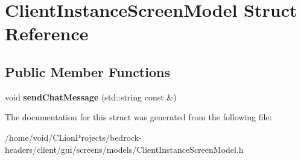 \hypertarget{struct_client_instance_screen_model}{}\section{Client\+Instance\+Screen\+Model Struct Reference}
\label{struct_client_instance_screen_model}
\subsection*{Public Member Functions}
\begin{DoxyCompactItemize}
\item 
\mbox{\label{struct_client_instance_screen_model_a3a33cc4aa7f3a3e2d51b4b42534473e6}} 
void {\bfseries send\+Chat\+Message} (std\+::string const \&)
\end{DoxyCompactItemize}


The documentation for this struct was generated from the following file\+:\begin{DoxyCompactItemize}
\item 
/home/void/\+C\+Lion\+Projects/bedrock-\/headers/client/gui/screens/models/Client\+Instance\+Screen\+Model.\+h\end{DoxyCompactItemize}
